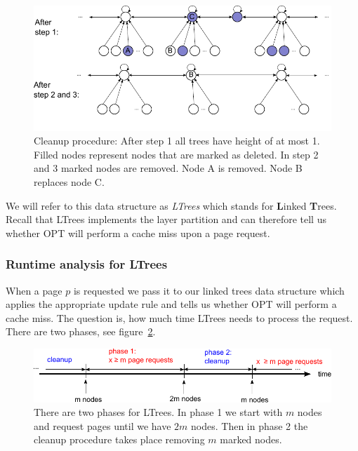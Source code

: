 \documentclass[a4paper,12pt, titlepage]{article}  %
\begin{document}
\begin{figure}[htp]
	\centering
	\includegraphics[scale=1.0]{./figures/LTrees_cleanup.pdf}
	\caption{Cleanup procedure: After step 1 all trees have height of at most 1. Filled nodes represent 
	nodes that are marked as deleted. In step 2 and 3 marked nodes are removed. Node A is removed. 
	Node B replaces node C.} 
	\label{fig:LTrees_cleanup}
\end{figure}

\noindent We will refer to this data structure as \emph{LTrees} which stands for \textbf{L}inked \textbf{T}rees.
Recall that LTrees implements the layer partition and can therefore tell us whether OPT will perform a cache miss
upon a page request.

\subsubsection{Runtime analysis for LTrees}
When a page $p$ is requested we pass it to our linked trees data structure which applies the appropriate update
rule and tells us whether OPT will perform a cache miss. The question is, how much time LTrees needs to process
the request. There are two phases, see figure~\ref{fig:LTrees_analysis}.

\begin{figure}[htp]
	\centering
	\includegraphics[scale=0.9]{./figures/LTrees_analysis.pdf}
	\caption{There are two phases for LTrees. In phase 1 we start with $m$ nodes and request pages until we 
		have $2m$ nodes. 
                    Then in phase 2 the cleanup procedure takes place removing $m$ marked nodes.} 
	\label{fig:LTrees_analysis}
\end{figure}
\end{document}
